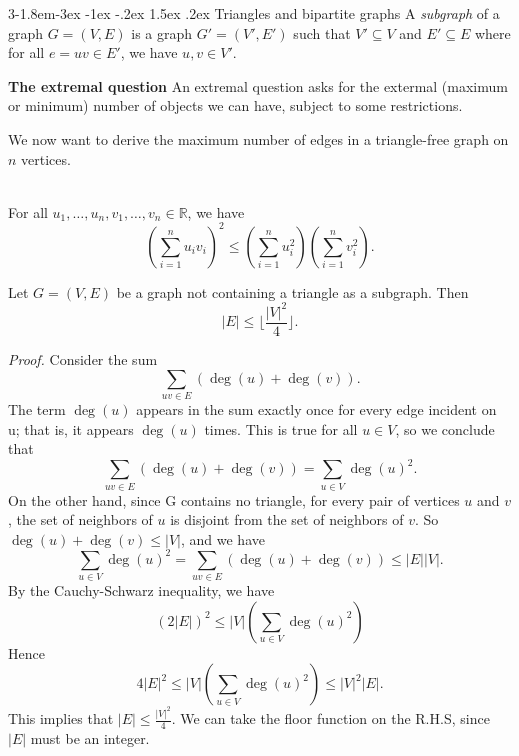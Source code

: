 \documentclass{tufte-handout}
\makeatletter
\renewcommand{\subsection}{\@startsection{subsection}%
    {3}{-1.8em}{-3ex \@plus -1ex \@minus -.2ex}%
    {1.5ex \@plus .2ex}
    {\hspace*{-5.5em}\fcolorbox{ltblue}{ltblue}{\parbox[c][1.0ex][b]{4em}{\phantom{space}}}
    \normalfont\large\itshape\color{ltblue}}}
\makeatother
\begin{document}
\subsection{Triangles and bipartite graphs}
A \textit{subgraph} of a graph \( G = (V,E) \) is a graph \( G' = (V',E') \) such that \( V' \subseteq V \) and \( E' \subseteq E \)
where for all \( e=uv \in E' \), we have \( u,v \in V' \).

\textbf{The extremal question} An extremal question asks for the extermal (maximum or minimum) number of objects
we can have, subject to some restrictions.

We now want to derive the maximum number of edges in a triangle-free graph on \( n \) vertices.

\begin{Theorem} \hfill\\
    For all \( u_1, \ldots, u_n, v_1, \ldots, v_n \in \mathbb{R} \), we have\[\left(\sum_{i=1}^{n} u_i v_i\right)^2 \leq \left(\sum_{i=1}^{n} u_i^2\right)\left(\sum_{i=1}^{n} v_i^2\right).\]
\end{Theorem}

\begin{Theorem}
    Let \( G = (V,E) \) be a graph not containing a triangle as a subgraph. Then
    \[ \left|E\right| \leq \lfloor \frac{\left|V\right|^2}{4} \rfloor.\]
\end{Theorem}

\textit{Proof.} Consider the sum \[ \sum_{uv\in E}\left(\deg(u)+\deg(v)\right).\]
The term \( \deg(u) \) appears in the sum exactly once for every edge incident on u; that is, it
appears \( \deg(u) \) times. This is true for all \( u \in V \), so we conclude that
\[ \sum_{uv\in E}\left(\deg(u)+\deg(v)\right) = \sum_{u\in V}\deg(u)^2.\]
On the other hand, since G contains no triangle, for every pair of vertices \( u\) and \( v \), the set
of neighbors of \( u \) is disjoint from the set of neighbors of \( v \). So \( \deg(u) +\deg(v) \leq \left|V\right| \), and we have
\[ \sum_{u\in V}\deg(u)^2=\sum_{uv\in E}\left(\deg(u)+\deg(v)\right) \leq \left|E\right|\left|V\right|.\]
By the Cauchy-Schwarz inequality, we have
\[(2\left|E\right|)^2\leq \left|V\right|\left(\sum_{u\in V}\deg(u)^2\right)\]
Hence \[4\left|E\right|^2\leq\left|V\right|\left(\sum_{u\in V}\deg(u)^2\right)\leq \left|V\right|^2\left|E\right|.\]
This implies that \( \left|E\right|\leq \frac{\left|V\right|^2}{4} \).
We can take the floor function on the R.H.S, since \( \left|E\right| \) must be an integer.\qedsymbol
\end{document}
